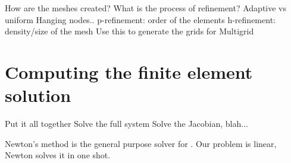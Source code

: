 How are the meshes created?
What is the process of refinement?
	Adaptive vs uniform
Hanging nodes..
p-refinement: order of the elements
h-refinement: density/size of the mesh
Use this to generate the grids for Multigrid










\section{Computing the finite element solution}

Put it all together
Solve the full system
Solve the Jacobian, blah...

Newton's method is the general purpose solver for \oomph.
Our problem is linear, Newton solves it in one shot.

